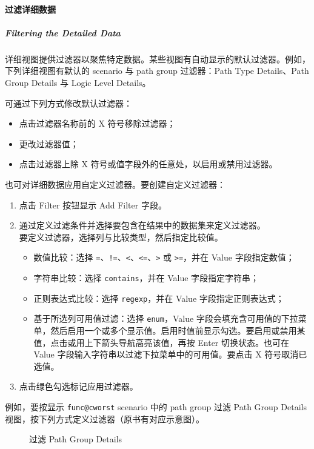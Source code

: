 \paragraph{过滤详细数据}
\subparagraph*{Filtering the Detailed Data}

详细视图提供过滤器以聚焦特定数据。某些视图有自动显示的默认过滤器。例如，下列详细视图有默认的 scenario 与 path group 过滤器：Path Type Details、Path Group Details 与 Logic Level Details。

可通过下列方式修改默认过滤器：
\begin{itemize}
  \item 点击过滤器名称前的 X 符号移除过滤器；
  \item 更改过滤器值；
  \item 点击过滤器上除 X 符号或值字段外的任意处，以启用或禁用过滤器。
\end{itemize}

也可对详细数据应用自定义过滤器。要创建自定义过滤器：
\begin{enumerate}
  \item 点击 Filter 按钮显示 Add Filter 字段。
  \item 通过定义过滤条件并选择要包含在结果中的数据集来定义过滤器。\\
    要定义过滤器，选择列与比较类型，然后指定比较值。
    \begin{itemize}
      \item 数值比较：选择 \texttt{=}、\texttt{!=}、\texttt{<}、\texttt{<=}、\texttt{>} 或 \texttt{>=}，并在 Value 字段指定数值；
      \item 字符串比较：选择 \texttt{contains}，并在 Value 字段指定字符串；
      \item 正则表达式比较：选择 \texttt{regexp}，并在 Value 字段指定正则表达式；
      \item 基于所选列可用值过滤：选择 \texttt{enum}，Value 字段会填充含可用值的下拉菜单，然后启用一个或多个显示值。启用时值前显示勾选。要启用或禁用某值，点击或用上下箭头导航高亮该值，再按 Enter 切换状态。也可在 Value 字段输入字符串以过滤下拉菜单中的可用值。要点击 X 符号取消已选值。
    \end{itemize}
  \item 点击绿色勾选标记应用过滤器。
\end{enumerate}

例如，要按显示 \texttt{func@cworst} scenario 中的 path group 过滤 Path Group Details 视图，按下列方式定义过滤器（原书有对应示意图）。

\begin{figure}[htbp]
\centering
{}
\caption{过滤 Path Group Details}
\label{fig:filter-path-group}
\end{figure}

